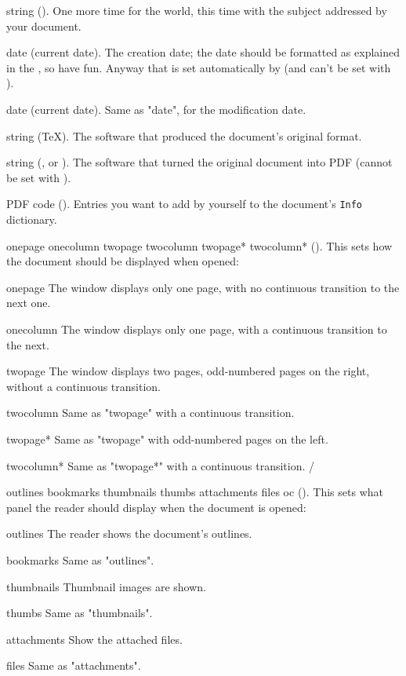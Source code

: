  string ().
One more time for the world, this time with the subject addressed by your document.

 date (current date).
The creation date; the date should be formatted as explained in the ,
so have fun. Anyway that is set automatically by \tex (and can't be set with \xetex).

 date (current date).
Same as \attr"date", for the modification date.

 string (TeX).
The software that produced the document's original format.

 string (\pdftex, \luatex or \xetex).
The software that turned the original document into PDF (cannot be set with \xetex).

 {PDF code} ().
Entries you want to add by yourself to the document's \verb"Info" dictionary.

 onepage onecolumn twopage twocolumn twopage* twocolumn* ().
This sets how the document should be displayed when opened:

onepage
The window displays only one page, with no continuous transition to the next one.

onecolumn
The window displays only one page, with a continuous transition to the next.

twopage
The window displays two pages, odd-numbered pages on the right,
without a continuous transition.

twocolumn
Same as \value"twopage" with a continuous transition.

twopage*
Same as \value"twopage" with odd-numbered pages on the left.

twocolumn*
Same as \value"twopage*" with a continuous transition.
/

 outlines bookmarks thumbnails thumbs attachments files oc ().
This sets what panel the reader should display when the document is
opened:

outlines
The reader shows the document's outlines.

bookmarks
Same as \value"outlines".

thumbnails
Thumbnail images are shown.

thumbs
Same as \value"thumbnails".

attachments
Show the attached files.

files
Same as \value"attachments".

